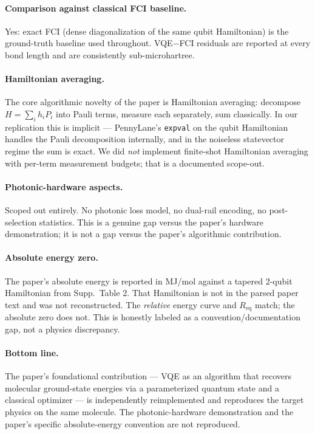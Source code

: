 \documentclass[11pt]{article}
\begin{document}
\paragraph{Comparison against classical FCI baseline.}
Yes: exact FCI (dense diagonalization of the same qubit Hamiltonian) is the ground-truth baseline used throughout. VQE$-$FCI residuals are reported at every bond length and are consistently sub-microhartree.

\paragraph{Hamiltonian averaging.}
The core algorithmic novelty of the paper is Hamiltonian averaging: decompose $H = \sum_i h_i P_i$ into Pauli terms, measure each separately, sum classically. In our replication this is implicit --- PennyLane's \verb|expval| on the qubit Hamiltonian handles the Pauli decomposition internally, and in the noiseless statevector regime the sum is exact. We did \emph{not} implement finite-shot Hamiltonian averaging with per-term measurement budgets; that is a documented scope-out.

\paragraph{Photonic-hardware aspects.}
Scoped out entirely. No photonic loss model, no dual-rail encoding, no post-selection statistics. This is a genuine gap versus the paper's hardware demonstration; it is not a gap versus the paper's algorithmic contribution.

\paragraph{Absolute energy zero.}
The paper's absolute energy is reported in MJ/mol against a tapered 2-qubit Hamiltonian from Supp.\ Table 2. That Hamiltonian is not in the parsed paper text and was not reconstructed. The \emph{relative} energy curve and $R_\mathrm{eq}$ match; the absolute zero does not. This is honestly labeled as a convention/documentation gap, not a physics discrepancy.

\paragraph{Bottom line.}
The paper's foundational contribution --- VQE as an algorithm that recovers molecular ground-state energies via a parameterized quantum state and a classical optimizer --- is independently reimplemented and reproduces the target physics on the same molecule. The photonic-hardware demonstration and the paper's specific absolute-energy convention are not reproduced.
\end{document}
